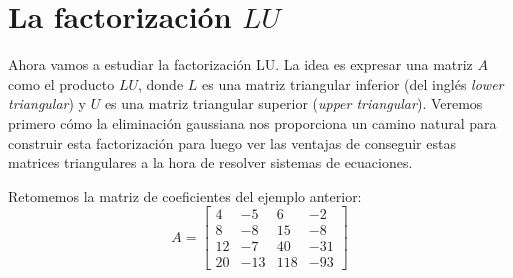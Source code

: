 \section{La factorización $LU$}\label{sec:LU}

Ahora vamos a estudiar la factorización LU. La idea es expresar una matriz $A$ como el producto $LU$, donde $L$ es una matriz triangular inferior (del inglés \textit{lower triangular}) y $U$ es una matriz triangular superior (\textit{upper triangular}). Veremos primero cómo la eliminación gaussiana nos proporciona un camino natural para construir esta factorización para luego ver las ventajas de conseguir estas matrices triangulares a la hora de resolver sistemas de ecuaciones.

Retomemos la matriz de coeficientes del ejemplo anterior:
\[
A = \begin{bmatrix}
4 & -5 &  6 & -2 \\
8 & -8 & 15 & -8 \\
12 & -7 & 40 & -31 \\
20 & -13 & 118 & -93
\end{bmatrix}
\]

